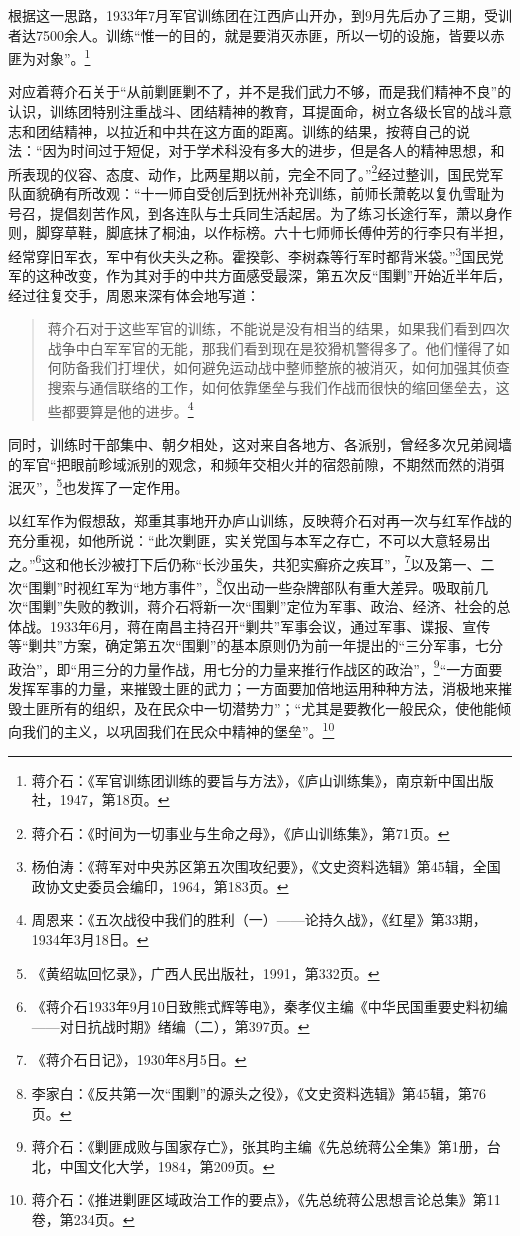 根据这一思路，1933年7月军官训练团在江西庐山开办，到9月先后办了三期，受训者达7500余人。训练“惟一的目的，就是要消灭赤匪，所以一切的设施，皆要以赤匪为对象”。\footnote{蒋介石：《军官训练团训练的要旨与方法》，《庐山训练集》，南京新中国出版社，1947，第18页。}


对应着蒋介石关于“从前剿匪剿不了，并不是我们武力不够，而是我们精神不良”的认识，训练团特别注重战斗、团结精神的教育，耳提面命，树立各级长官的战斗意志和团结精神，以拉近和中共在这方面的距离。训练的结果，按蒋自己的说法：“因为时间过于短促，对于学术科没有多大的进步，但是各人的精神思想，和所表现的仪容、态度、动作，比两星期以前，完全不同了。”\footnote{蒋介石：《时间为一切事业与生命之母》，《庐山训练集》，第71页。}经过整训，国民党军队面貌确有所改观：“十一师自受创后到抚州补充训练，前师长萧乾以复仇雪耻为号召，提倡刻苦作风，到各连队与士兵同生活起居。为了练习长途行军，萧以身作则，脚穿草鞋，脚底抹了桐油，以作标榜。六十七师师长傅仲芳的行李只有半担，经常穿旧军衣，军中有伙夫头之称。霍揆彰、李树森等行军时都背米袋。”\footnote{杨伯涛：《蒋军对中央苏区第五次围攻纪要》，《文史资料选辑》第45辑，全国政协文史委员会编印，1964，第183页。}国民党军的这种改变，作为其对手的中共方面感受最深，第五次反“围剿”开始近半年后，经过往复交手，周恩来深有体会地写道：

\begin{quote}

蒋介石对于这些军官的训练，不能说是没有相当的结果，如果我们看到四次战争中白军军官的无能，那我们看到现在是狡猾机警得多了。他们懂得了如何防备我们打埋伏，如何避免运动战中整师整旅的被消灭，如何加强其侦查搜索与通信联络的工作，如何依靠堡垒与我们作战而很快的缩回堡垒去，这些都要算是他的进步。\footnote{周恩来：《五次战役中我们的胜利（一）——论持久战》，《红星》第33期，1934年3月18日。}
\end{quote}


同时，训练时干部集中、朝夕相处，这对来自各地方、各派别，曾经多次兄弟阋墙的军官“把眼前畛域派别的观念，和频年交相火并的宿怨前隙，不期然而然的消弭泯灭”，\footnote{《黄绍竑回忆录》，广西人民出版社，1991，第332页。}也发挥了一定作用。


以红军作为假想敌，郑重其事地开办庐山训练，反映蒋介石对再一次与红军作战的充分重视，如他所说：“此次剿匪，实关党国与本军之存亡，不可以大意轻易出之。”\footnote{《蒋介石1933年9月10日致熊式辉等电》，秦孝仪主编《中华民国重要史料初编——对日抗战时期》绪编（二），第397页。}这和他长沙被打下后仍称“长沙虽失，共犯实癣疥之疾耳”，\footnote{《蒋介石日记》，1930年8月5日。}以及第一、二次“围剿”时视红军为“地方事件”，\footnote{李家白：《反共第一次“围剿”的源头之役》，《文史资料选辑》第45辑，第76页。}仅出动一些杂牌部队有重大差异。吸取前几次“围剿”失败的教训，蒋介石将新一次“围剿”定位为军事、政治、经济、社会的总体战。1933年6月，蒋在南昌主持召开“剿共”军事会议，通过军事、谍报、宣传等“剿共”方案，确定第五次“围剿”的基本原则仍为前一年提出的“三分军事，七分政治”，即“用三分的力量作战，用七分的力量来推行作战区的政治”，\footnote{蒋介石：《剿匪成败与国家存亡》，张其昀主编《先总统蒋公全集》第1册，台北，中国文化大学，1984，第209页。}“一方面要发挥军事的力量，来摧毁土匪的武力；一方面要加倍地运用种种方法，消极地来摧毁土匪所有的组织，及在民众中一切潜势力”；“尤其是要教化一般民众，使他能倾向我们的主义，以巩固我们在民众中精神的堡垒”。\footnote{蒋介石：《推进剿匪区域政治工作的要点》，《先总统蒋公思想言论总集》第11卷，第234页。}


